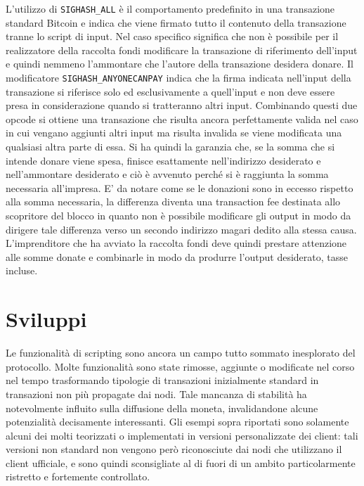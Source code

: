 L'utilizzo di \verb|SIGHASH_ALL| è il comportamento predefinito in una transazione standard Bitcoin e indica che viene firmato tutto il contenuto della transazione tranne lo script di input. Nel caso specifico significa che non è possibile per il realizzatore della raccolta fondi modificare la transazione di riferimento dell'input e quindi nemmeno l'ammontare che l'autore della transazione desidera donare. Il modificatore \verb|SIGHASH_ANYONECANPAY| indica che la firma indicata nell'input della transazione si riferisce solo ed esclusivamente a quell'input e non deve essere presa in considerazione quando si tratteranno altri input.
Combinando questi due opcode si ottiene una transazione che risulta ancora perfettamente valida nel caso in cui vengano aggiunti altri input ma risulta invalida se viene modificata una qualsiasi altra parte di essa. Si ha quindi la garanzia che, se la somma che si intende donare viene spesa, finisce esattamente nell'indirizzo desiderato e nell'ammontare desiderato e ciò è avvenuto perché si è raggiunta la somma necessaria all'impresa. E' da notare come se le donazioni sono in eccesso rispetto alla somma necessaria, la differenza diventa una transaction fee destinata allo scopritore del blocco in quanto non è possibile modificare gli output in modo da dirigere tale differenza verso un secondo indirizzo magari dedito alla stessa causa. L'imprenditore che ha avviato la raccolta fondi deve quindi prestare attenzione alle somme donate e combinarle in modo da produrre l'output desiderato, tasse incluse.

\section{Sviluppi}

Le funzionalità di scripting sono ancora un campo tutto sommato inesplorato del protocollo. Molte funzionalità sono state rimosse, aggiunte o modificate nel corso nel tempo trasformando tipologie di transazioni inizialmente standard in transazioni non più propagate dai nodi. Tale mancanza di stabilità ha notevolmente influito sulla diffusione della moneta, invalidandone alcune potenzialità decisamente interessanti. Gli esempi sopra riportati sono solamente alcuni dei molti teorizzati o implementati in versioni personalizzate dei client: tali versioni non standard non vengono però riconosciute dai nodi che utilizzano il client ufficiale, e sono quindi sconsigliate al di fuori di un ambito particolarmente ristretto e fortemente controllato.

